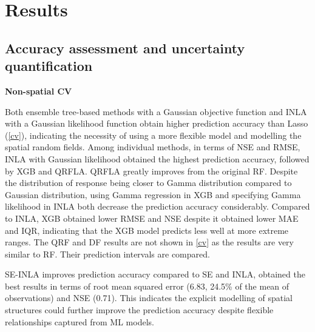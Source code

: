 \documentclass{article}
\begin{document}



\section{Results}
\subsection{Accuracy assessment and uncertainty quantification}



\textbf{Non-spatial CV}

Both ensemble tree-based methods with a Gaussian objective function and INLA with a Gaussian likelihood function obtain higher prediction accuracy than Lasso (\cref{cv}), indicating the necessity of using a more flexible model and modelling the spatial random fields. Among individual methods, in terms of NSE and RMSE, INLA with Gaussian likelihood obtained the highest prediction accuracy, followed by XGB and QRFLA. QRFLA greatly improves from the original RF. Despite the distribution of response being closer to Gamma distribution compared to Gaussian distribution, using Gamma regression in XGB and specifying Gamma likelihood in INLA both decrease the prediction accuracy considerably. Compared to INLA, XGB obtained lower RMSE and NSE despite it obtained lower MAE and IQR, indicating that the XGB model predicts less well at more extreme ranges. The QRF and DF results are not shown in \cref{cv} as the results are very similar to RF. Their prediction intervals are compared. 

 
SE-INLA improves prediction accuracy compared to SE and INLA, obtained the best results in terms of root mean squared error (6.83, 24.5\% of the mean of observations) and NSE (0.71). This indicates the explicit modelling of spatial structures could further improve the prediction accuracy despite flexible relationships captured from ML models.
 
\end{document}

